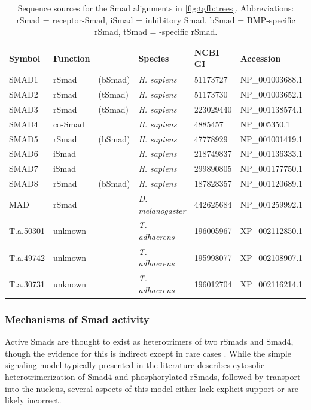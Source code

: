 	
    \begin{table}[!bt]
    \centering
	\footnotesize
    \caption[List of Smads]{ Sequence sources for the 
    Smad alignments in \autoref{fig:tgfb:trees}. Abbreviations:
    rSmad = receptor-Smad, iSmad = inhibitory Smad, bSmad = 
    BMP-specific rSmad, tSmad = \tgf-specific rSmad.}
    \label{table:pathways:methods:smad}
    \begin{tabular}{llllll}
    \hline
    Symbol    & Function &         & Species & NCBI GI & Accession \\ \hline
	SMAD1     & rSmad    & (bSmad) & \textit{H. sapiens} & 51173727  & NP\_001003688.1 \\ 
	SMAD2     & rSmad    & (tSmad) & \textit{H. sapiens} & 51173730  & NP\_001003652.1 \\ 
	SMAD3     & rSmad    & (tSmad) & \textit{H. sapiens} & 223029440 & NP\_001138574.1 \\ 
	SMAD4     & co-Smad  &         & \textit{H. sapiens} & 4885457   & NP\_005350.1    \\ 
	SMAD5     & rSmad    & (bSmad) & \textit{H. sapiens} & 47778929  & NP\_001001419.1 \\ 
	SMAD6     & iSmad    &         & \textit{H. sapiens} & 218749837 & NP\_001136333.1 \\ 
	SMAD7     & iSmad    &         & \textit{H. sapiens} & 299890805 & NP\_001177750.1 \\ 
	SMAD8     & rSmad    & (bSmad) & \textit{H. sapiens} & 187828357 & NP\_001120689.1 \\ 
	MAD       & rSmad    &         & \textit{D. melanogaster} & 442625684 & NP\_001259992.1 \\ 
	T.a.50301 & unknown  &         & \textit{T. adhaerens} & 196005967 & XP\_002112850.1 \\ 
	T.a.49742 & unknown  &         & \textit{T. adhaerens} & 195998077 & XP\_002108907.1 \\ 
	T.a.30731 & unknown  &         & \textit{T. adhaerens} & 196012704 & XP\_002116214.1 \\ 
    \hline
    \end{tabular}
    \end{table}


\subsubsection{Mechanisms of Smad activity}
	
Active Smads are thought to exist as heterotrimers of two rSmads
and Smad4, though the evidence for this is indirect
except in rare cases \cite{Zieba2012}. While the simple signaling model typically
presented in the literature describes cytosolic heterotrimerization
of Smad4 and phosphorylated rSmads, followed by transport into the
nucleus, several aspects of this model either lack explicit support or are
likely incorrect.


